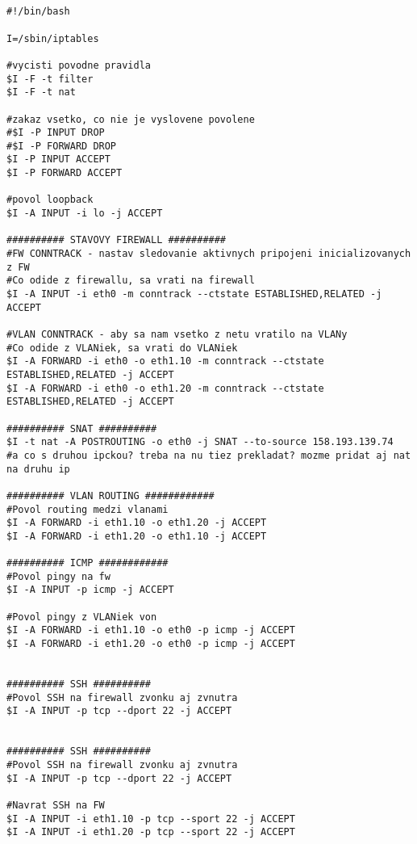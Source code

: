 \noindent
{\selectfont
\\

\begin{small}

\begin{verbatim}

#!/bin/bash

I=/sbin/iptables

#vycisti povodne pravidla
$I -F -t filter
$I -F -t nat

#zakaz vsetko, co nie je vyslovene povolene
#$I -P INPUT DROP
#$I -P FORWARD DROP
$I -P INPUT ACCEPT
$I -P FORWARD ACCEPT

#povol loopback
$I -A INPUT -i lo -j ACCEPT

########## STAVOVY FIREWALL ##########
#FW CONNTRACK - nastav sledovanie aktivnych pripojeni inicializovanych z FW
#Co odide z firewallu, sa vrati na firewall
$I -A INPUT -i eth0 -m conntrack --ctstate ESTABLISHED,RELATED -j ACCEPT

#VLAN CONNTRACK - aby sa nam vsetko z netu vratilo na VLANy
#Co odide z VLANiek, sa vrati do VLANiek
$I -A FORWARD -i eth0 -o eth1.10 -m conntrack --ctstate ESTABLISHED,RELATED -j ACCEPT
$I -A FORWARD -i eth0 -o eth1.20 -m conntrack --ctstate ESTABLISHED,RELATED -j ACCEPT

########## SNAT ##########
$I -t nat -A POSTROUTING -o eth0 -j SNAT --to-source 158.193.139.74
#a co s druhou ipckou? treba na nu tiez prekladat? mozme pridat aj nat na druhu ip

########## VLAN ROUTING ############
#Povol routing medzi vlanami
$I -A FORWARD -i eth1.10 -o eth1.20 -j ACCEPT
$I -A FORWARD -i eth1.20 -o eth1.10 -j ACCEPT

########## ICMP ############
#Povol pingy na fw
$I -A INPUT -p icmp -j ACCEPT

#Povol pingy z VLANiek von
$I -A FORWARD -i eth1.10 -o eth0 -p icmp -j ACCEPT
$I -A FORWARD -i eth1.20 -o eth0 -p icmp -j ACCEPT


########## SSH ##########
#Povol SSH na firewall zvonku aj zvnutra
$I -A INPUT -p tcp --dport 22 -j ACCEPT


########## SSH ##########
#Povol SSH na firewall zvonku aj zvnutra
$I -A INPUT -p tcp --dport 22 -j ACCEPT

#Navrat SSH na FW
$I -A INPUT -i eth1.10 -p tcp --sport 22 -j ACCEPT
$I -A INPUT -i eth1.20 -p tcp --sport 22 -j ACCEPT


\end{verbatim}
\end{small}}
